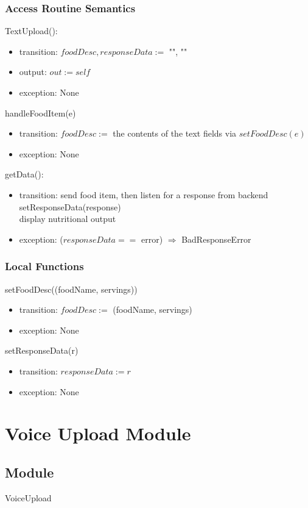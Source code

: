 \documentclass[12pt, titlepage]{article}
\begin{document}
\subsubsection{Access Routine Semantics}
\noindent TextUpload():
\begin{itemize}
	\item transition: $foodDesc, responseData := $ "", ""
	\item output: $out := self$ 
	\item exception: None
\end{itemize}
\noindent handleFoodItem(e)
\begin{itemize}
	\item transition: $foodDesc :=$ the contents of the text fields via 
	$setFoodDesc(e)$
	\item exception: None
\end{itemize}
\noindent getData():
\begin{itemize}
	\item transition: send food item, then listen for a response from 
	backend\\ setResponseData(response) \\ display nutritional output
	\item exception: ($responseData ==$ error) $\Rightarrow$ BadResponseError
\end{itemize}
\subsubsection{Local Functions}
\noindent setFoodDesc((foodName, servings))
\begin{itemize}
	\item transition: $ foodDesc := $ (foodName, servings)
	\item exception: None
\end{itemize}
\noindent setResponseData(r)
\begin{itemize}
	\item transition: $ responseData:=r $
	\item exception: None
\end{itemize}

\newpage

\section{Voice Upload Module} \label{VoiceUpload} 
\subsection{Module}
VoiceUpload
\end{document}
